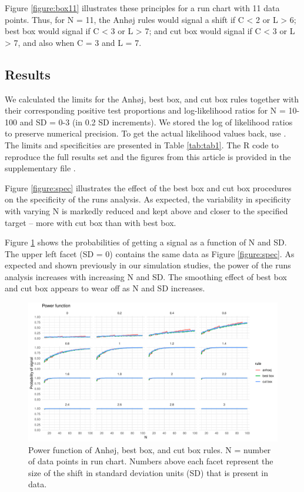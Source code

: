 Figure \ref{figure:box11} illustrates these principles for a run chart
with 11 data points. Thus, for N = 11, the Anhøj rules would signal a
shift if C \textless{} 2 or L \textgreater{} 6; best box would signal if
C \textless{} 3 or L \textgreater{} 7; and cut box would signal if C
\textless{} 3 or L \textgreater{} 7, and also when C = 3 and L = 7.

\hypertarget{results}{%
\subsection{Results}\label{results}}

We calculated the limits for the Anhøj, best box, and cut box rules
together with their corresponding positive test proportions and
log-likelihood ratios for N = 10-100 and SD = 0-3 (in 0.2 SD
increments). We stored the log of likelihood ratios to preserve
numerical precision. To get the actual likelihood values back, use
. The limits and specificities are presented
in Table \ref{tab:tab1}. The R code to reproduce the full results set
and the figures from this article is provided in the supplementary file
.

Figure \ref{figure:spec} illustrates the effect of the best box and cut
box procedures on the specificity of the runs analysis. As expected, the
variability in specificity with varying N is markedly reduced and kept
above and closer to the specified target -- more with cut box than with
best box.

Figure \ref{figure:pwr} shows the probabilities of getting a signal as a
function of N and SD. The upper left facet (SD = 0) contains the same
data as Figure \ref{figure:spec}. As expected and shown previously in
our simulation studies, the power of the runs analysis increases with
increasing N and SD. The smoothing effect of best box and cut box
appears to wear off as N and SD increases.

\begin{figure}[htbp]
  \centering
  \includegraphics[width=\textwidth]{fig_pwr.pdf}
  \caption{Power function of Anhøj, best box, and cut box rules.
           N = number of data points in run chart.
           Numbers above each facet represent the size of the shift in standard
           deviation units (SD) that is present in data.}
  \label{figure:pwr}
\end{figure}


